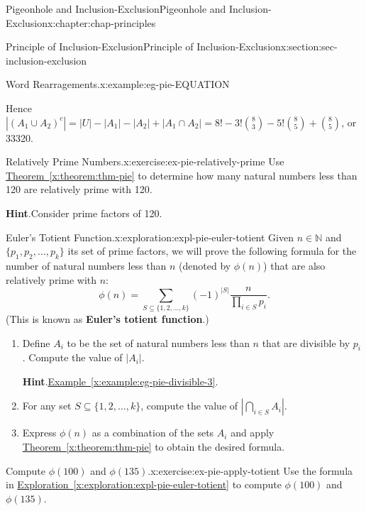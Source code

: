 \documentclass[oneside,10pt,]{book}
\newcommand{\blocktitlefont}{\relax}
\newcommand{\xreffont}{\relax}
\newcommand{\terminology}[1]{\textbf{#1}}
\numberwithin{equation}{section}
\begin{document}
\begin{chapterptx}{Pigeonhole and Inclusion-Exclusion}{}{Pigeonhole and Inclusion-Exclusion}{}{}{x:chapter:chap-principles}
\begin{sectionptx}{Principle of Inclusion-Exclusion}{}{Principle of Inclusion-Exclusion}{}{}{x:section:sec-inclusion-exclusion}
\begin{example}{Word Rearragements.}{x:example:eg-pie-EQUATION}
%
\par
Hence \(|(A_1 \cup A_2)^c| = |U| - |A_1| - |A_2| + |A_1 \cap A_2| = 8! - 3!\binom{8}{3} - 5!\binom{8}{5} + \binom{8}{5}\), or 33320.%
\end{example}
\begin{inlineexercise}{Relatively Prime Numbers.}{x:exercise:ex-pie-relatively-prime}%
Use \hyperref[x:theorem:thm-pie]{Theorem~{\xreffont\ref{x:theorem:thm-pie}}} to determine how many natural numbers less than 120 are relatively prime with 120.%
\par\smallskip%
\noindent\textbf{\blocktitlefont Hint}.\hypertarget{g:hint:id531196}{}\quad{}Consider prime factors of 120.%
\end{inlineexercise}%
\begin{exploration}{Euler's Totient Function.}{x:exploration:expl-pie-euler-totient}%
Given \(n \in \mathbb{N}\) and \(\{p_1,p_2,\ldots,p_k\}\) its set of prime factors, we will prove the following formula for the number of natural numbers less than \(n\) (denoted by \(\phi(n)\)) that are also relatively prime with \(n\):%
\begin{equation*}
\phi(n) = \sum_{S \subseteq \{1,2,\ldots,k\}}(-1)^{|S|}\dfrac{n}{\prod_{i\in S} p_i}\text{.}
\end{equation*}
(This is known as \terminology{Euler's totient function}.)%
\begin{enumerate}[font=\bfseries,label=(\alph*),ref=\alph*]
\item{}Define \(A_i\) to be the set of natural numbers less than \(n\) that are divisible by \(p_i\). Compute the value of \(|A_i|\).%
\par\smallskip%
\noindent\textbf{\blocktitlefont Hint}.\hypertarget{g:hint:id531261}{}\quad{}\hyperref[x:example:eg-pie-divisible-3]{Example~{\xreffont\ref{x:example:eg-pie-divisible-3}}}.%
\item{}For any set \(S \subseteq \{1,2,\ldots,k\}\), compute the value of \(\left|\displaystyle\bigcap_{i\in S} A_i \right|\).%
\item{}Express \(\phi(n)\) as a combination of the sets \(A_i\) and apply \hyperref[x:theorem:thm-pie]{Theorem~{\xreffont\ref{x:theorem:thm-pie}}} to obtain the desired formula.%
\end{enumerate}
\end{exploration}%
\begin{inlineexercise}{Compute \(\phi(100)\) and \(\phi(135)\).}{x:exercise:ex-pie-apply-totient}%
Use the formula in \hyperref[x:exploration:expl-pie-euler-totient]{Exploration~{\xreffont\ref{x:exploration:expl-pie-euler-totient}}} to compute \(\phi(100)\) and \(\phi(135)\).%

\end{inlineexercise}
\end{sectionptx}
\end{chapterptx}
\end{document}
